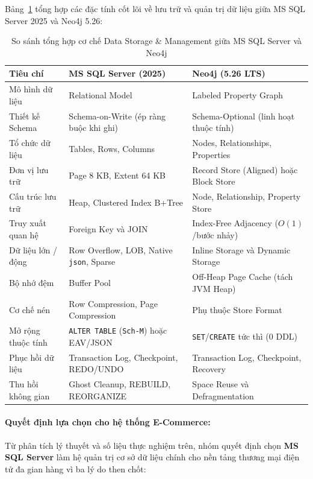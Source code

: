 Bảng~\ref{tab:t1_summary} tổng hợp các đặc tính cốt lõi về lưu trữ và quản trị dữ liệu giữa MS SQL Server 2025 và Neo4j 5.26:

\begin{table}[htbp]
  \centering
  \footnotesize
  \setlength{\tabcolsep}{4pt}
  \renewcommand{\arraystretch}{1.25}
  \setlength{\emergencystretch}{2em}
  \caption{So sánh tổng hợp cơ chế Data Storage \& Management giữa MS SQL Server và Neo4j}
  \label{tab:t1_summary}
  \begin{tabular}{|p{2.9cm}|p{5.0cm}|p{5.0cm}|}
    \hline
    \textbf{Tiêu chí} & \textbf{MS SQL Server (2025)} & \textbf{Neo4j (5.26 LTS)} \\
    \hline
    Mô hình dữ liệu & Relational Model & Labeled Property Graph \\ \hline
    Thiết kế Schema & Schema-on-Write (ép ràng buộc khi ghi) & Schema-Optional (linh hoạt thuộc tính) \\ \hline
    Tổ chức dữ liệu & Tables, Rows, Columns & Nodes, Relationships, Properties \\ \hline
    Đơn vị lưu trữ & Page 8 KB, Extent 64 KB & Record Store (Aligned) hoặc Block Store \\ \hline
    Cấu trúc lưu trữ & Heap, Clustered Index B+Tree & Node, Relationship, Property Store \\ \hline
    Truy xuất quan hệ & Foreign Key và JOIN & Index-Free Adjacency ($O(1)$/bước nhảy) \\ \hline
    Dữ liệu lớn / động & Row Overflow, LOB, Native \texttt{json}, Sparse & Inline Storage và Dynamic Storage \\ \hline
    Bộ nhớ đệm & Buffer Pool & Off-Heap Page Cache (tách JVM Heap) \\ \hline
    Cơ chế nén & Row Compression, Page Compression & Phụ thuộc Store Format \\ \hline
    Mở rộng thuộc tính & \texttt{ALTER TABLE} (\texttt{Sch-M}) hoặc EAV/JSON & \texttt{SET}/\texttt{CREATE} tức thì (0 DDL) \\ \hline
    Phục hồi dữ liệu & Transaction Log, Checkpoint, REDO/UNDO & Transaction Log, Checkpoint, Recovery \\ \hline
    Thu hồi không gian & Ghost Cleanup, REBUILD, REORGANIZE & Space Reuse và Defragmentation \\ \hline
  \end{tabular}
\end{table}

\paragraph{Quyết định lựa chọn cho hệ thống E-Commerce:} Từ phân tích lý thuyết và số liệu thực nghiệm trên, nhóm quyết định chọn \textbf{MS SQL Server} làm hệ quản trị cơ sở dữ liệu chính cho nền tảng thương mại điện tử đa gian hàng vì ba lý do then chốt:

